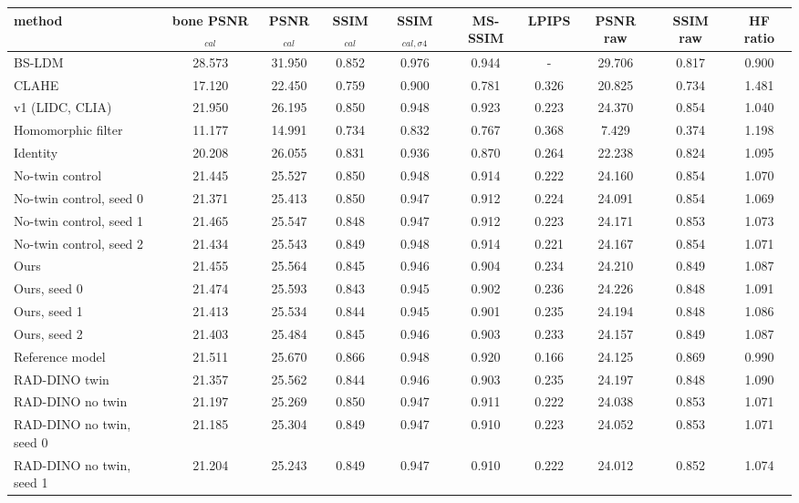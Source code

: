 \begin{tabular}{lccccccccc}
\toprule
method & bone PSNR$_{cal}$ & PSNR$_{cal}$ & SSIM$_{cal}$ & SSIM$_{cal,\sigma4}$ & MS-SSIM & LPIPS & PSNR raw & SSIM raw & HF ratio \\
\midrule
BS-LDM & 28.573 & 31.950 & 0.852 & 0.976 & 0.944 & - & 29.706 & 0.817 & 0.900 \\
CLAHE & 17.120 & 22.450 & 0.759 & 0.900 & 0.781 & 0.326 & 20.825 & 0.734 & 1.481 \\
v1 (LIDC, CLIA) & 21.950 & 26.195 & 0.850 & 0.948 & 0.923 & 0.223 & 24.370 & 0.854 & 1.040 \\
Homomorphic filter & 11.177 & 14.991 & 0.734 & 0.832 & 0.767 & 0.368 & 7.429 & 0.374 & 1.198 \\
Identity & 20.208 & 26.055 & 0.831 & 0.936 & 0.870 & 0.264 & 22.238 & 0.824 & 1.095 \\
No-twin control & 21.445 & 25.527 & 0.850 & 0.948 & 0.914 & 0.222 & 24.160 & 0.854 & 1.070 \\
No-twin control, seed 0 & 21.371 & 25.413 & 0.850 & 0.947 & 0.912 & 0.224 & 24.091 & 0.854 & 1.069 \\
No-twin control, seed 1 & 21.465 & 25.547 & 0.848 & 0.947 & 0.912 & 0.223 & 24.171 & 0.853 & 1.073 \\
No-twin control, seed 2 & 21.434 & 25.543 & 0.849 & 0.948 & 0.914 & 0.221 & 24.167 & 0.854 & 1.071 \\
Ours & 21.455 & 25.564 & 0.845 & 0.946 & 0.904 & 0.234 & 24.210 & 0.849 & 1.087 \\
Ours, seed 0 & 21.474 & 25.593 & 0.843 & 0.945 & 0.902 & 0.236 & 24.226 & 0.848 & 1.091 \\
Ours, seed 1 & 21.413 & 25.534 & 0.844 & 0.945 & 0.901 & 0.235 & 24.194 & 0.848 & 1.086 \\
Ours, seed 2 & 21.403 & 25.484 & 0.845 & 0.946 & 0.903 & 0.233 & 24.157 & 0.849 & 1.087 \\
Reference model & 21.511 & 25.670 & 0.866 & 0.948 & 0.920 & 0.166 & 24.125 & 0.869 & 0.990 \\
RAD-DINO twin & 21.357 & 25.562 & 0.844 & 0.946 & 0.903 & 0.235 & 24.197 & 0.848 & 1.090 \\
RAD-DINO no twin & 21.197 & 25.269 & 0.850 & 0.947 & 0.911 & 0.222 & 24.038 & 0.853 & 1.071 \\
RAD-DINO no twin, seed 0 & 21.185 & 25.304 & 0.849 & 0.947 & 0.910 & 0.223 & 24.052 & 0.853 & 1.071 \\
RAD-DINO no twin, seed 1 & 21.204 & 25.243 & 0.849 & 0.947 & 0.910 & 0.222 & 24.012 & 0.852 & 1.074 \\

\end{tabular}
